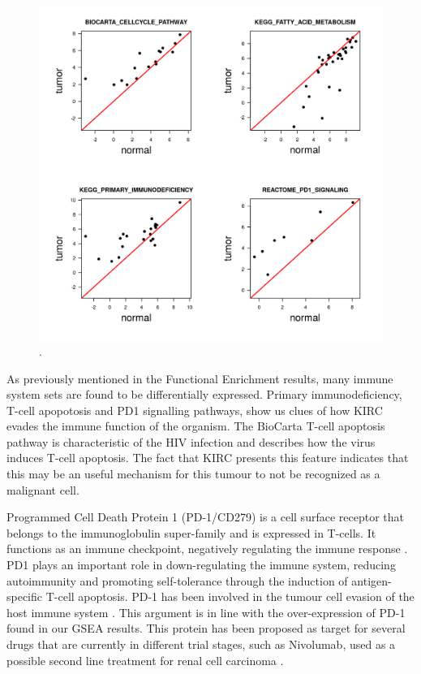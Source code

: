 \documentclass[9pt,twocolumn,twoside]{gsajnl}
\begin{document}
\begin{figure}[htbp]
\centering
\includegraphics[width=\textwidth]{figures/fig3.png}
\caption{. }%
\label{fig:spectrum}
\end{figure}

As previously mentioned in the Functional Enrichment results, many immune system sets are found to be differentially expressed. Primary immunodeficiency, T-cell apopotosis and PD1 signalling pathways, show us clues of how KIRC evades the immune function of the organism. The BioCarta T-cell apoptosis pathway is characteristic of the HIV infection and describes how the virus induces T-cell apoptosis. The fact that KIRC presents this feature indicates that this may be an useful mechanism for this tumour to not be recognized as a malignant cell.

Programmed Cell Death Protein 1 (PD-1/CD279) is a cell surface receptor that belongs to the immunoglobulin super-family and is expressed in T-cells. It functions as an immune checkpoint, negatively regulating the immune response \citep{Francisco2010}. PD1 plays an important role in down-regulating the immune system, reducing autoimmunity and promoting self-tolerance through the induction of antigen-specific T-cell apoptosis.
PD-1 has been involved in the tumour cell evasion of the host immune system \citep{Iwai2002}. This argument is in line with the over-expression of PD-1 found in our GSEA results. This protein has been proposed as target for several drugs that are currently in different trial stages, such as Nivolumab, used as a possible second line treatment for renal cell carcinoma \citep{nivolumab}.
\end{document}
